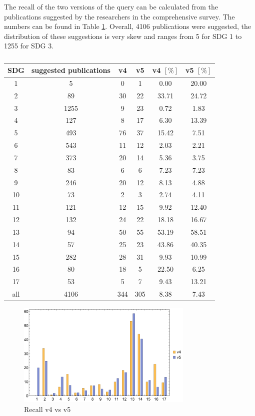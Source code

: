 \documentclass{article}
\begin{document}
The recall of the two versions of the query can be calculated from the publications suggested by the researchers in the comprehensive survey. The numbers can be found in Table \ref{recalltable}. Overall, 4106 publications were suggested, the distribution of these suggestions is very skew and ranges from 5 for SDG 1 to 1255 for SDG 3.
\begin{table}[H]
\centering 
 \begin{tabular}{cccccc}
 \toprule
  SDG & suggested publications & v4 & v5 & v4 $[\%]$ & v5 $[\%]$ \\
  \hline
 1 & 5 & 0 & 1 & 0.00 & 20.00 \\
 2 & 89 & 30 & 22 & 33.71 & 24.72 \\
 3 & 1255 & 9 & 23 & 0.72 & 1.83 \\
 4 & 127 & 8 & 17 & 6.30 & 13.39 \\
 5 & 493 & 76 & 37 & 15.42 & 7.51 \\
 6 & 543 & 11 & 12 & 2.03 & 2.21 \\
 7 & 373 & 20 & 14 & 5.36 & 3.75 \\
 8 & 83 & 6 & 6 & 7.23 & 7.23 \\
 9 & 246 & 20 & 12 & 8.13 & 4.88 \\
 10 & 73 & 2 & 3 & 2.74 & 4.11 \\
 11 & 121 & 12 & 15 & 9.92 & 12.40 \\
 12 & 132 & 24 & 22 & 18.18 & 16.67 \\
 13 & 94 & 50 & 55 & 53.19 & 58.51 \\
 14 & 57 & 25 & 23 & 43.86 & 40.35 \\
 15 & 282 & 28 & 31 & 9.93 & 10.99 \\
 16 & 80 & 18 & 5 & 22.50 & 6.25 \\
 17 & 53 & 5 & 7 & 9.43 & 13.21 \\
 all & 4106 & 344 & 305 & 8.38 & 7.43 \\
 \bottomrule
\end{tabular}
\caption{
}
\label{recalltable}
\end{table}




\begin{figure}[H]
	\centering
  \includegraphics[width=0.75\textwidth]{figures/recallbarchart.pdf}
	\caption{Recall v4 vs v5}
	\label{recallbarchart}
\end{figure}
\end{document}
